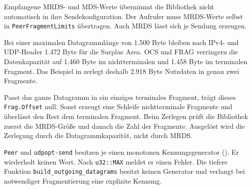 Empfangene MRDS- und MDS-Werte übernimmt die Bibliothek nicht automatisch in ihre Sendekonfiguration.
Der Aufrufer muss MRDS-Werte selbst in \texttt{PeerFragmentLimits} übertragen. Auch MRDS lässt sich je
Sendung erzeugen.

Bei einer maximalen Datagrammlänge von 1.500 Byte bleiben nach IPv4- und UDP-Header 1.472 Byte für die
Surplus Area. OCS und FRAG verringern die Datenkapazität auf 1.460 Byte im nichtterminalen und
1.458 Byte im terminalen Fragment. Das Beispiel in  zerlegt deshalb
2.918 Byte Nutzdaten in genau zwei Fragmente.

Passt das ganze Datagramm in ein einziges terminales Fragment, trägt dieses \texttt{Frag.Offset} null.
Sonst erzeugt eine Schleife nichtterminale Fragmente und überlässt den Rest dem terminalen Fragment.
Beim Zerlegen prüft die Bibliothek zuerst die MRDS-Größe und danach die Zahl der Fragmente. Ausgelöst
wird die Zerlegung durch die Datagrammkapazität, nicht durch MRDS.

\texttt{Peer} und \texttt{udpopt-send} besitzen je einen monotonen Kennungsgenerator
(). Er wiederholt keinen Wert. Nach \texttt{u32::MAX} meldet er einen
Fehler. Die tiefere Funktion \texttt{build\_outgoing\_datagrams} besitzt keinen Generator und verlangt
bei notwendiger Fragmentierung eine explizite Kennung.

